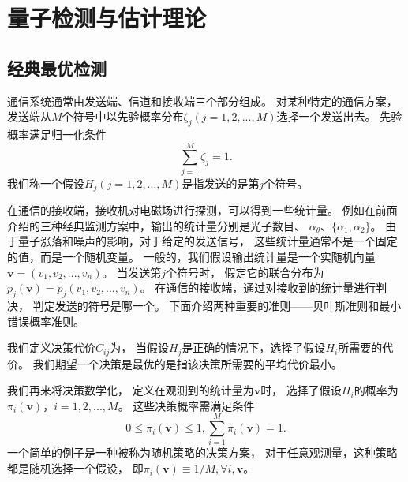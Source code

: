 \section{量子检测与估计理论}
\subsection{经典最优检测}
通信系统通常由发送端、信道和接收端三个部分组成。
对某种特定的通信方案，发送端从$M$个符号中以先验概率分布$\zeta_j(j=1,2,...,M)$选择一个发送出去。
先验概率满足归一化条件
\begin{equation}
\sum_{j=1}^M \zeta_j = 1.
\end{equation}
我们称一个假设$H_j (j=1,2,...,M)$是指发送的是第$j$个符号。



在通信的接收端，接收机对电磁场进行探测，可以得到一些统计量。
例如在前面介绍的三种经典监测方案中，输出的统计量分别是光子数目、
$\alpha_\theta$、$\{\alpha_1, \alpha_2\}$。
由于量子涨落和噪声的影响，对于给定的发送信号，
这些统计量通常不是一个固定的值，而是一个随机变量。
一般的，我们假设输出统计量是一个实随机向量$\bm{v} = (v_1, v_2, ..., v_n)$。
当发送第$j$个符号时，
假定它的联合分布为
$p_j(\bm{v}) = p_j(v_1, v_2, ..., v_n)$。
在通信的接收端，通过对接收到的统计量进行判决，
判定发送的符号是哪一个。
下面介绍两种重要的准则——贝叶斯准则和最小错误概率准则。

我们定义决策代价$C_{ij}$为，
当假设$H_j$是正确的情况下，选择了假设$H_i$所需要的代价。
我们期望一个决策是最优的是指该决策所需要的平均代价最小。

我们再来将决策数学化\cite{yzf2002tjxhcl,helstrom1976quantum}，
定义在观测到的统计量为$\bm{v}$时，
选择了假设$H_i$的概率为$\pi_i(\bm{v})$，$i=1,2,...,M$。
这些决策概率需满足条件
\begin{equation}
0 \le \pi_i(\bm{v}) \le 1,  \sum_{i=1}^M \pi_i(\bm{v}) = 1.
\label{eq:pi-cond}
\end{equation}
一个简单的例子是一种被称为随机策略的决策方案，
对于任意观测量，这种策略都是随机选择一个假设，
即$\pi_i(\bm{v}) \equiv 1/M, \forall i, \bm{v}$。

